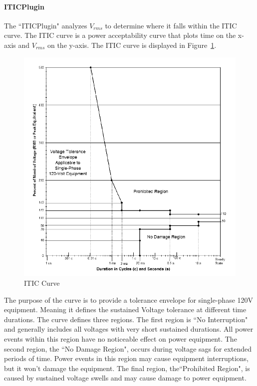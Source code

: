 \paragraph{ITICPlugin}
The ``ITICPlugin" analyzes $V_{rms}$ to determine where it falls within the ITIC curve\cite{thallam2000power}. The ITIC curve is a power acceptability curve that plots time on the x-axis and $V_{rms}$ on the y-axis. The ITIC curve is displayed in Figure~\ref{fig:IticCurve}.

\begin{figure}
	\centering
	\includegraphics[width=\linewidth]{figures/itic.png}
	\caption{ITIC Curve}
	\label{fig:IticCurve}
\end{figure}

The purpose of the curve is to provide a tolerance envelope for single-phase 120V equipment. Meaning it defines the sustained Voltage tolerance at different time durations. The curve defines three regions. The first region is ``No Interruption" and generally includes all voltages with very short sustained durations. All power events within this region have no noticeable effect on power equipment. The second region, the ``No Damage Region", occurs during voltage sags for extended periods of time. Power events in this region may cause equipment interruptions, but it won't damage the equipment. The final region, the``Prohibited Region", is caused by sustained voltage swells and may cause damage to power equipment.

